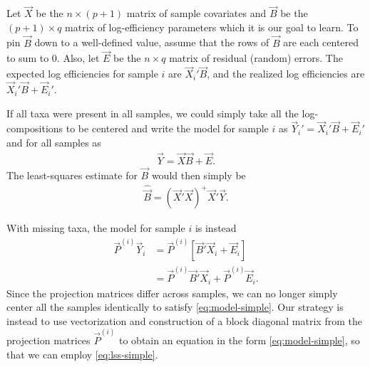 Let $\vec X$ be the $n\times(p+1)$ matrix of sample covariates and $\vec B$ be
the $(p+1)\times q$ matrix of log-efficiency parameters which it is our goal to
learn. To pin $\vec B$ down to a well-defined value, assume that the rows of
$\vec B$ are each centered to sum to 0. Also, let $\vec E$ be the $n \times q$
matrix of residual (random) errors. The expected log efficiencies for sample
$i$ are $\vec X_i' \vec B$, and the realized log efficiencies are
$\vec X_i' \vec B + \vec E_i'$.

If all taxa were present in all samples, we could simply take all the
log-compositions to be centered and write the model for sample $i$ as $\vec
Y_i' = \vec X_i' \vec B + \vec E_i'$ and for all samples as 
\begin{align} 
  \label{eq:model-simple}
  \vec Y = \vec X \vec B + \vec E.
\end{align}
The least-squares estimate for $\vec B$ would then simply be
\begin{align}
  \label{eq:lss-simple}
  \hat{\vec B} = (\vec X' \vec X)^{+} \vec X' \vec Y.
\end{align}

With missing taxa, the model for sample $i$ is instead
\begin{align} 
  \label{}
  \vec P^{(i)} \vec Y_i 
  &= \vec P^{(i)} [ \vec B' \vec X_i + \vec E_i ]
  \\&= \vec P^{(i)} \vec B' \vec X_i + \vec P^{(i)}\vec E_i.
\end{align}
Since the projection matrices differ across samples, we can no longer simply
center all the samples identically to satisfy \eqref{eq:model-simple}.  Our
strategy is instead to use vectorization and construction of a block diagonal
matrix from the projection matrices $\vec P^{(i)}$ to obtain an equation in the
form \eqref{eq:model-simple}, so that we can employ \eqref{eq:lss-simple}.

